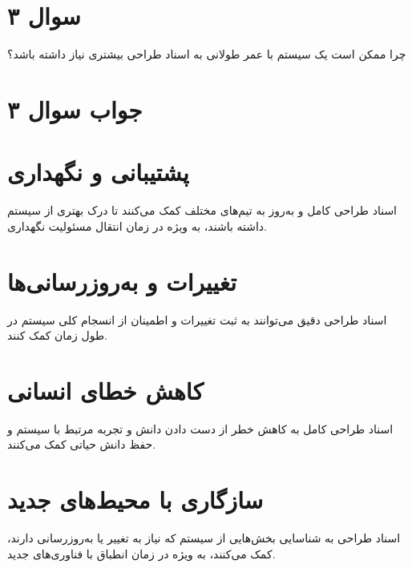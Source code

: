 \section*{سوال ۳}

چرا ممکن است یک سیستم با عمر طولانی به اسناد طراحی بیشتری نیاز داشته باشد؟

\section*{جواب سوال ۳}

\section*{پشتیبانی و نگهداری}
اسناد طراحی کامل و به‌روز به تیم‌های مختلف کمک می‌کنند تا درک بهتری از سیستم داشته باشند، به ویژه در زمان انتقال مسئولیت نگهداری.

\section*{تغییرات و به‌روزرسانی‌ها}
اسناد طراحی دقیق می‌توانند به ثبت تغییرات و اطمینان از انسجام کلی سیستم در طول زمان کمک کنند.

\section*{کاهش خطای انسانی}
اسناد طراحی کامل به کاهش خطر از دست دادن دانش و تجربه مرتبط با سیستم و حفظ دانش حیاتی کمک می‌کنند.

\section*{سازگاری با محیط‌های جدید}
اسناد طراحی به شناسایی بخش‌هایی از سیستم که نیاز به تغییر یا به‌روزرسانی دارند، کمک می‌کنند، به ویژه در زمان انطباق با فناوری‌های جدید.